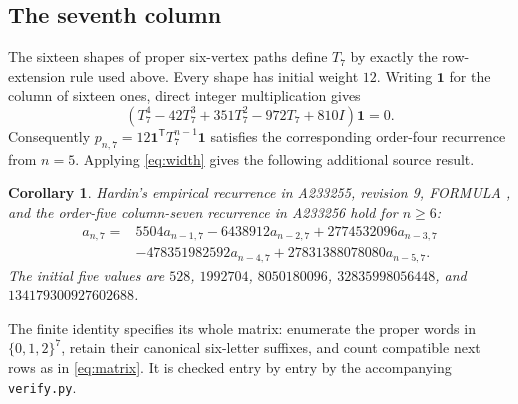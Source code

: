 \documentclass[11pt]{article}
\newtheorem{corollary}[theorem]{Corollary}
\newcommand{\one}{\mathbf{1}}
\begin{document}
\subsection{The seventh column}
The sixteen shapes of proper six-vertex paths define $T_7$ by exactly the
row-extension rule used above. Every shape has initial weight $12$.
Writing $\one$ for the column of sixteen ones, direct integer multiplication
gives
\[
(T_7^4-42T_7^3+351T_7^2-972T_7+810I)\one=0.
\]
Consequently $p_{n,7}=12\one^{\mathsf T}T_7^{n-1}\one$ satisfies the
corresponding order-four recurrence from $n=5$.
Applying \eqref{eq:width} gives the following additional source result.
\begin{corollary}\label{cor:seven}
Hardin's empirical recurrence in A233255, revision 9, FORMULA \cite{seven},
and the order-five column-seven recurrence in A233256 hold for $n\ge6$:
\begin{align*}
a_{n,7}={}&5504a_{n-1,7}-6438912a_{n-2,7}+2774532096a_{n-3,7}\\
&-478351982592a_{n-4,7}+27831388078080a_{n-5,7}.
\end{align*}
The initial five values are $528$, $1992704$, $8050180096$,
$32835998056448$, and $134179300927602688$.
\end{corollary}
The finite identity specifies its whole matrix: enumerate the proper
words in $\{0,1,2\}^7$, retain their canonical six-letter suffixes, and
count compatible next rows as in \eqref{eq:matrix}.
It is checked entry by entry by the accompanying \texttt{verify.py}.
\end{document}
